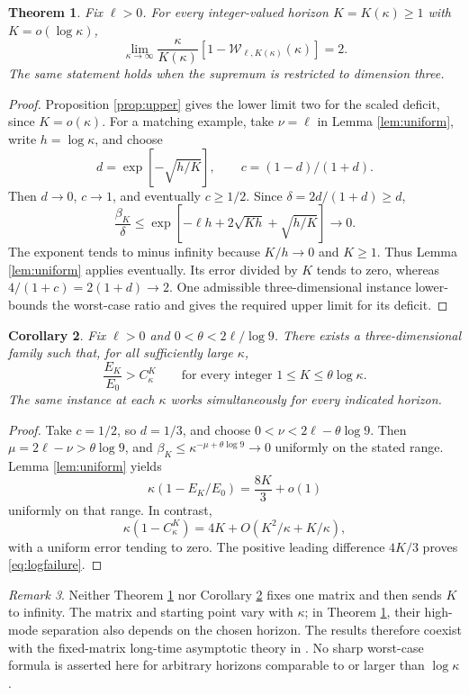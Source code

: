 \documentclass[11pt,a4paper]{article}
\newtheorem{theorem}{Theorem}
\newtheorem{corollary}[theorem]{Corollary}
\theoremstyle{remark}
\newtheorem{remark}[theorem]{Remark}
\newcommand{\W}{\mathcal W}
\newcommand{\Ck}{C_\kappa}
\begin{document}
\begin{theorem}\label{thm:moving}
Fix $\ell>0$. For every integer-valued horizon $K=K(\kappa)\ge1$ with $K=o(\log\kappa)$,
\begin{equation}\label{eq:moving}
 \lim_{\kappa\to\infty}\frac{\kappa}{K(\kappa)}
 [1-\W_{\ell,K(\kappa)}(\kappa)]=2.
\end{equation}
The same statement holds when the supremum is restricted to dimension three.
\end{theorem}
\begin{proof}
Proposition \ref{prop:upper} gives the lower limit two for the scaled deficit, since $K=o(\kappa)$. For a matching example, take $\nu=\ell$ in Lemma \ref{lem:uniform}, write $h=\log\kappa$, and choose
\[
 d=\exp[-\sqrt{h/K}],\qquad c=(1-d)/(1+d).
\]
Then $d\to0$, $c\to1$, and eventually $c\ge1/2$. Since $\delta=2d/(1+d)\ge d$,
\[
 \frac{\beta_K}{\delta}
 \le\exp[-\ell h+2\sqrt{Kh}+\sqrt{h/K}]\longrightarrow0.
\]
The exponent tends to minus infinity because $K/h\to0$ and $K\ge1$. Thus Lemma \ref{lem:uniform} applies eventually. Its error divided by $K$ tends to zero, whereas $4/(1+c)=2(1+d)\to2$. One admissible three-dimensional instance lower-bounds the worst-case ratio and gives the required upper limit for its deficit.
\end{proof}

\begin{corollary}\label{cor:log}
Fix $\ell>0$ and $0<\theta<2\ell/\log9$. There exists a three-dimensional family such that, for all sufficiently large $\kappa$,
\begin{equation}\label{eq:logfailure}
 \frac{E_K}{E_0}>\Ck^K
 \qquad\text{for every integer }1\le K\le\theta\log\kappa.
\end{equation}
The same instance at each $\kappa$ works simultaneously for every indicated horizon.
\end{corollary}
\begin{proof}
Take $c=1/2$, so $d=1/3$, and choose $0<\nu<2\ell-\theta\log9$. Then $\mu=2\ell-\nu>\theta\log9$, and $\beta_K\le\kappa^{-\mu+\theta\log9}\to0$ uniformly on the stated range. Lemma \ref{lem:uniform} yields
\[
 \kappa(1-E_K/E_0)=\frac{8K}{3}+o(1)
\]
uniformly on that range. In contrast,
\[
 \kappa(1-\Ck^K)=4K+O(K^2/\kappa+K/\kappa),
\]
with a uniform error tending to zero. The positive leading difference $4K/3$ proves \eqref{eq:logfailure}.
\end{proof}

\begin{remark}
Neither Theorem \ref{thm:moving} nor Corollary \ref{cor:log} fixes one matrix and then sends $K$ to infinity. The matrix and starting point vary with $\kappa$; in Theorem \ref{thm:moving}, their high-mode separation also depends on the chosen horizon. The results therefore coexist with the fixed-matrix long-time asymptotic theory in \cite{PWZ2006,HDLZ2022}. No sharp worst-case formula is asserted here for arbitrary horizons comparable to or larger than $\log\kappa$.
\end{remark}
\end{document}
